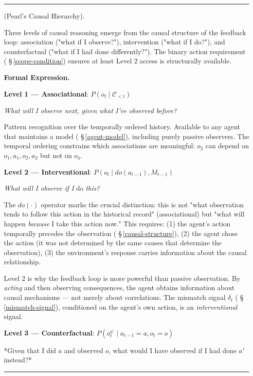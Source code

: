 \documentclass[11pt,oneside]{article}
\newcounter{claim}[section]
\renewcommand{\theclaim}{\thesection.\arabic{claim}}
\newenvironment{segment}[2]{%
  \refstepcounter{claim}%
  \bigskip\noindent\hrule\smallskip
  \noindent{\bfseries #1~\theclaim}\enskip(#2).\par\smallskip
  \noindent\ignorespaces
}{%
  \par\smallskip\noindent\hrule\bigskip
}
\newenvironment{definition}[1][]{\begin{segment}{Definition}{#1}}{\end{segment}}
\begin{document}
\begin{definition}[Pearl's Causal Hierarchy]
\label{pearl-causal-hierarchy}
Three levels of causal reasoning emerge from the causal structure of the feedback loop: association ("what if I observe?"), intervention ("what if I do?"), and counterfactual ("what if I had done differently?"). The binary action requirement ( \S\,\ref{scope-condition}) ensures at least Level 2 access is structurally available.



\medskip\noindent\textbf{Formal Expression.}



\textbf{Level 1 — Associational}: $P(o_t \mid \mathcal{C}_{< t})$

\textit{What will I observe next, given what I've observed before?}

Pattern recognition over the temporally ordered history. Available to any agent that maintains a model ( \S\,\ref{agent-model}), including purely passive observers. The temporal ordering constrains which associations are meaningful: $o_3$ can depend on $o_1, a_1, o_2, a_2$ but not on $o_4$.

\textbf{Level 2 — Interventional}: $P(o_t \mid do(a_{t-1}), M_{t-1})$

\textit{What will I observe if I} do \textit{this?}

The $do(\cdot)$ operator marks the crucial distinction: this is not "what observation tends to follow this action in the historical record" (associational) but "what will happen \textit{because} I take this action now." This requires: (1) the agent's action temporally precedes the observation ( \S\,\ref{causal-structure}), (2) the agent chose the action (it was not determined by the same causes that determine the observation), (3) the environment's response carries information about the causal relationship.

Level 2 is why the feedback loop is more powerful than passive observation. By \textit{acting} and then observing consequences, the agent obtains information about causal mechanisms — not merely about correlations. The mismatch signal $\delta_t$ ( \S\,\ref{mismatch-signal}), conditioned on the agent's own action, is an \textit{interventional} signal.

\textbf{Level 3 — Counterfactual}: $P(o_t^{a'} \mid a_{t-1} = a, o_t = o)$

*Given that I did $a$ and observed $o$, what would I have observed if I had done $a'$ instead?*


\end{definition}
\end{document}
